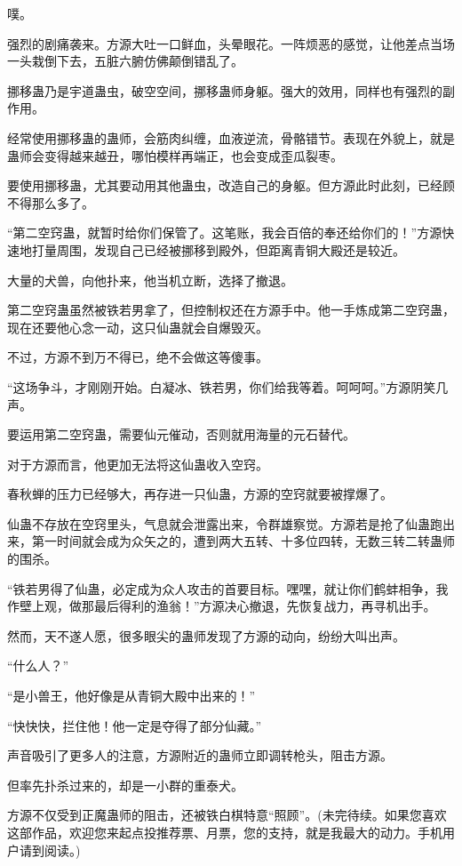 \begin{this_body}
噗。

强烈的剧痛袭来。方源大吐一口鲜血，头晕眼花。一阵烦恶的感觉，让他差点当场一头栽倒下去，五脏六腑仿佛颠倒错乱了。

挪移蛊乃是宇道蛊虫，破空空间，挪移蛊师身躯。强大的效用，同样也有强烈的副作用。

经常使用挪移蛊的蛊师，会筋肉纠缠，血液逆流，骨骼错节。表现在外貌上，就是蛊师会变得越来越丑，哪怕模样再端正，也会变成歪瓜裂枣。

要使用挪移蛊，尤其要动用其他蛊虫，改造自己的身躯。但方源此时此刻，已经顾不得那么多了。

“第二空窍蛊，就暂时给你们保管了。这笔账，我会百倍的奉还给你们的！”方源快速地打量周围，发现自己已经被挪移到殿外，但距离青铜大殿还是较近。

大量的犬兽，向他扑来，他当机立断，选择了撤退。

第二空窍蛊虽然被铁若男拿了，但控制权还在方源手中。他一手炼成第二空窍蛊，现在还要他心念一动，这只仙蛊就会自爆毁灭。

不过，方源不到万不得已，绝不会做这等傻事。

“这场争斗，才刚刚开始。白凝冰、铁若男，你们给我等着。呵呵呵。”方源阴笑几声。

要运用第二空窍蛊，需要仙元催动，否则就用海量的元石替代。

对于方源而言，他更加无法将这仙蛊收入空窍。

春秋蝉的压力已经够大，再存进一只仙蛊，方源的空窍就要被撑爆了。

仙蛊不存放在空窍里头，气息就会泄露出来，令群雄察觉。方源若是抢了仙蛊跑出来，第一时间就会成为众矢之的，遭到两大五转、十多位四转，无数三转二转蛊师的围杀。

“铁若男得了仙蛊，必定成为众人攻击的首要目标。嘿嘿，就让你们鹤蚌相争，我作壁上观，做那最后得利的渔翁！”方源决心撤退，先恢复战力，再寻机出手。

然而，天不遂人愿，很多眼尖的蛊师发现了方源的动向，纷纷大叫出声。

“什么人？”

“是小兽王，他好像是从青铜大殿中出来的！”

“快快快，拦住他！他一定是夺得了部分仙藏。”

声音吸引了更多人的注意，方源附近的蛊师立即调转枪头，阻击方源。

但率先扑杀过来的，却是一小群的重泰犬。

方源不仅受到正魔蛊师的阻击，还被铁白棋特意“照顾”。(未完待续。如果您喜欢这部作品，欢迎您来起点投推荐票、月票，您的支持，就是我最大的动力。手机用户请到阅读。)

\end{this_body}

